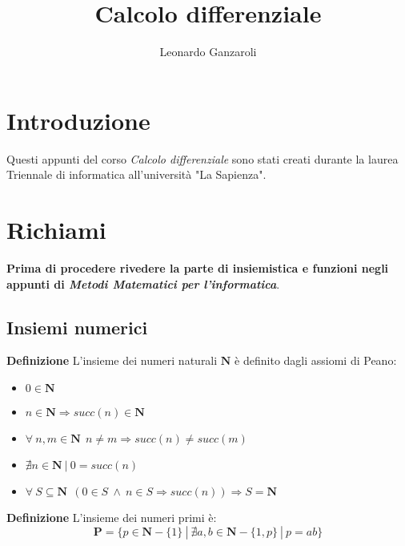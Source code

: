 \documentclass{article}
\title{Calcolo differenziale}
\author{Leonardo Ganzaroli}
\date{}
\begin{document}
\maketitle


\tableofcontents

\newpage

\hypersetup{allcolors=black}

\section*{Introduzione}

Questi appunti del corso \textit{Calcolo differenziale} sono stati creati durante la laurea Triennale di informatica all'università "La Sapienza".

\newpage

\section{Richiami}

\textbf{Prima di procedere rivedere la parte di insiemistica e funzioni negli appunti di \textit{Metodi Matematici per l'informatica}}.

\subsection{Insiemi numerici}

\textbf{Definizione} L'insieme dei numeri naturali $\mathbf{N}$ è definito dagli assiomi di Peano:
\begin{itemize}
    \item $0\in\mathbf{N}$
    \item $n\in\mathbf{N}\Rightarrow succ(n)\in\mathbf{N}$
    \item $\forall\ n,m\in\mathbf{N}\ \ n\neq m\Rightarrow succ(n)\neq succ(m)$
    \item $\nexists n\in\mathbf{N}\ |\ 0=succ(n)$
    \item $\forall\ S\subseteq\mathbf{N}\ \ (0\in S \ \wedge\ n\in S \Rightarrow succ(n))\Rightarrow S=\mathbf{N}$\newline
\end{itemize}

\noindent\textbf{Definizione} L'insieme dei numeri primi è:
$$\mathbf{P}=\{p\in\mathbf{N}-\{1\}\ |\ \nexists a,b\in\mathbf{N}-\{1,p\}\ |\ p=ab\}$$\newline
\end{document}
